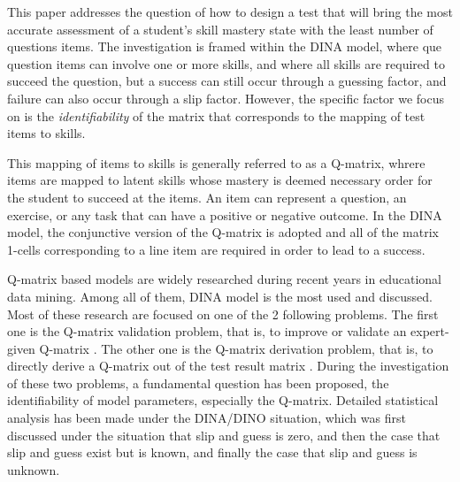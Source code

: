\documentclass{edm_template}
\begin{document}
This paper addresses the question of how to design a test that will bring the most accurate assessment of a student's skill mastery state with the least number of questions items.  The investigation is framed within the DINA model, where que question items can involve one or more skills, and where all skills are required to succeed the question, but a success can still occur through a guessing factor, and failure can also occur through a slip factor.  However, the specific factor we focus on is the \textit{identifiability} of the matrix that corresponds to the mapping of test items to skills.


This mapping of items to skills is generally referred to as a Q-matrix, whrere items are mapped to latent skills whose mastery is deemed necessary order for the student to succeed at the items.  An item can represent a question, an exercise, or any task that can have a positive or negative outcome.  In the DINA model, the conjunctive version of the Q-matrix is adopted and all of the matrix 1-cells corresponding to a line item are required in order to lead to a success.  

Q-matrix based models are widely researched during recent years in educational data mining. Among all of them, DINA model is the most used and discussed. Most of these research are focused on one of the 2 following problems. The first one is the Q-matrix validation problem, that is, to improve or validate an expert-given Q-matrix \cite{de2015general, chiu2013statistical, desmarais2013matrix}. The other one is the Q-matrix derivation problem, that is, to directly derive a Q-matrix out of the test result matrix \cite{barnes2010novel, liu2012data, desmarais2015combining, xu2016boosted}. During the investigation of these two problems, a fundamental question has been proposed, the identifiability of model parameters, especially the Q-matrix. Detailed statistical analysis has been made under the DINA/DINO situation, which was first discussed under the situation that slip and guess is zero\cite{chiu2009cluster}, and then the case that slip and guess exist but is known\cite{liu2013theory}, and finally the case that slip and guess is unknown\cite{chen2015statistical}. 
\end{document}
